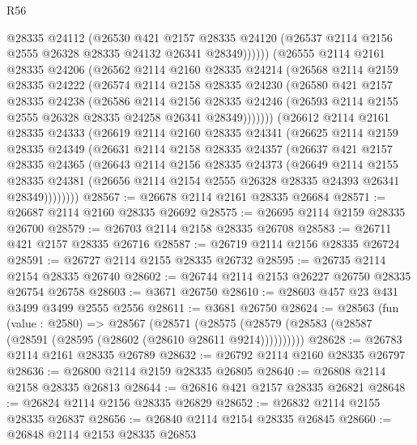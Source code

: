 \begin{lexlean}{R56}
\begin{coremodule}
            @28335
            @24112
            (@26530
              @421
              @2157
              @28335
              @24120
              (@26537 @2114 @2156 @2555 @26328 @28335 @24132 @26341 @28349))))))
    (@26555
      @2114
      @2161
      @28335
      @24206
      (@26562
        @2114
        @2160
        @28335
        @24214
        (@26568
          @2114
          @2159
          @28335
          @24222
          (@26574
            @2114
            @2158
            @28335
            @24230
            (@26580
              @421
              @2157
              @28335
              @24238
              (@26586
                @2114
                @2156
                @28335
                @24246
                (@26593 @2114 @2155 @2555 @26328 @28335 @24258 @26341 @28349)))))))
    (@26612
      @2114
      @2161
      @28335
      @24333
      (@26619
        @2114
        @2160
        @28335
        @24341
        (@26625
          @2114
          @2159
          @28335
          @24349
          (@26631
            @2114
            @2158
            @28335
            @24357
            (@26637
              @421
              @2157
              @28335
              @24365
              (@26643
                @2114
                @2156
                @28335
                @24373
                (@26649
                  @2114
                  @2155
                  @28335
                  @24381
                  (@26656 @2114 @2154 @2555 @26328 @28335 @24393 @26341 @28349))))))))
@28567 := @26678 @2114 @2161 @28335 @26684
@28571 := @26687 @2114 @2160 @28335 @26692
@28575 := @26695 @2114 @2159 @28335 @26700
@28579 := @26703 @2114 @2158 @28335 @26708
@28583 := @26711 @421 @2157 @28335 @26716
@28587 := @26719 @2114 @2156 @28335 @26724
@28591 := @26727 @2114 @2155 @28335 @26732
@28595 := @26735 @2114 @2154 @28335 @26740
@28602 := @26744 @2114 @2153 @26227 @26750 @28335 @26754 @26758
@28603 := @3671 @26750
@28610 := @28603 @457 @23 @431 @3499 @3499 @2555 @2556
@28611 := @3681 @26750
@28624 := @28563
    (fun (value : @2580) =>
    @28567
      (@28571 (@28575 (@28579 (@28583 (@28587 (@28591 (@28595 (@28602 (@28610 @28611 @9214))))))))))
@28628 := @26783 @2114 @2161 @28335 @26789
@28632 := @26792 @2114 @2160 @28335 @26797
@28636 := @26800 @2114 @2159 @28335 @26805
@28640 := @26808 @2114 @2158 @28335 @26813
@28644 := @26816 @421 @2157 @28335 @26821
@28648 := @26824 @2114 @2156 @28335 @26829
@28652 := @26832 @2114 @2155 @28335 @26837
@28656 := @26840 @2114 @2154 @28335 @26845
@28660 := @26848 @2114 @2153 @28335 @26853

\end{coremodule}
\end{lexlean}
